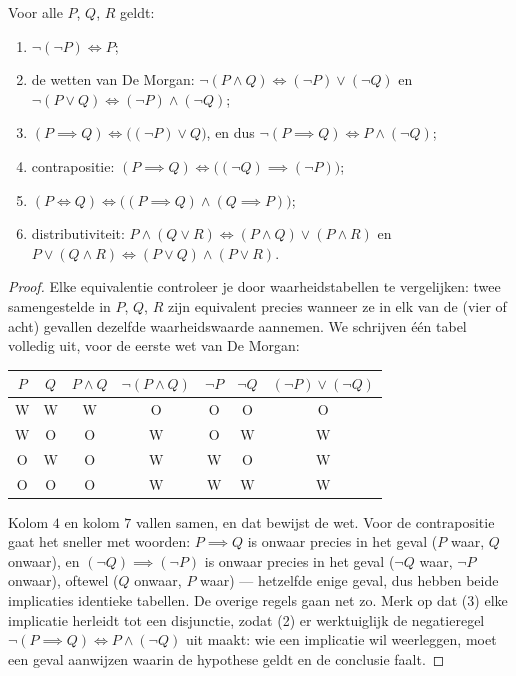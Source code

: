 \begin{proposition}\label{prop:b1:logic:rules}
Voor alle  $P$, $Q$, $R$ geldt:
\begin{enumerate}
  \item $\lnot(\lnot P) \iff P$;
  \item de wetten van De Morgan:
        $\lnot(P \land Q) \iff (\lnot P) \lor (\lnot Q)$ en
        $\lnot(P \lor Q) \iff (\lnot P) \land (\lnot Q)$;
  \item $(P \implies Q) \iff \bigl((\lnot P) \lor Q\bigr)$, en dus
        $\lnot(P \implies Q) \iff P \land (\lnot Q)$;
  \item contrapositie:
        $(P \implies Q) \iff \bigl((\lnot Q) \implies (\lnot P)\bigr)$;
  \item $(P \iff Q) \iff \bigl((P \implies Q) \land (Q \implies
        P)\bigr)$;
  \item distributiviteit: $P \land (Q \lor R) \iff (P \land Q) \lor
        (P \land R)$ en $P \lor (Q \land R) \iff (P \lor Q) \land
        (P \lor R)$.
\end{enumerate}
\end{proposition}

\begin{proof}
Elke equivalentie controleer je door waarheidstabellen te vergelijken:
twee samengestelde  in $P$, $Q$, $R$ zijn equivalent precies
wanneer ze in elk van de (vier of acht) gevallen dezelfde waarheidswaarde
aannemen. We schrijven één tabel volledig uit, voor de eerste wet van De
Morgan:
\begin{center}
\begin{tabular}{cc|c|c|cc|c}
$P$ & $Q$ & $P \land Q$ & $\lnot(P \land Q)$ & $\lnot P$ & $\lnot Q$ &
$(\lnot P) \lor (\lnot Q)$ \\
\hline
W & W & W & O & O & O & O \\
W & O & O & W & O & W & W \\
O & W & O & W & W & O & W \\
O & O & O & W & W & W & W \\
\end{tabular}
\end{center}
Kolom $4$ en kolom $7$ vallen samen, en dat bewijst de wet. Voor de
contrapositie gaat het sneller met woorden: $P \implies Q$ is onwaar
precies in het geval ($P$ waar, $Q$ onwaar), en $(\lnot Q) \implies
(\lnot P)$ is onwaar precies in het geval ($\lnot Q$ waar, $\lnot P$
onwaar), oftewel ($Q$ onwaar, $P$ waar) --- hetzelfde enige geval, dus
hebben beide implicaties identieke tabellen. De overige regels gaan
net zo. Merk op dat (3) elke implicatie herleidt tot een disjunctie,
zodat (2) er werktuiglijk de negatieregel $\lnot(P \implies Q) \iff P
\land (\lnot Q)$ uit maakt: wie een implicatie wil weerleggen, moet een
geval aanwijzen waarin de hypothese geldt en de conclusie faalt.
\end{proof}

